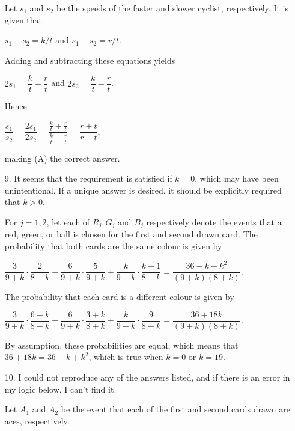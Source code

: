 \documentclass[11pt,fleqn,dvipsnames,usenames]{article}
\begin{document}
\begin{enumerate}
Let $s_{1}$ and $s_{2}$ be the speeds of the faster and slower cyclist, respectively.  It is given that
\begin{center}
$s_{1} + s_{2} = k/t$ and $s_{1} - s_{2} = r/t$.
\end{center}
Adding and subtracting these equations yields
\begin{center}
$2s_{1} = \dfrac{k}{t} + \dfrac{r}{t}$ and $2s_{2} = \dfrac{k}{t} - \dfrac{r}{t}$.
\end{center}
Hence
\begin{center}
$\dfrac{s_{1}}{s_{2}} = \dfrac{2s_{1}}{2s_{2}} = \dfrac{\frac{k}{t} + \frac{r}{t}}{\frac{k}{t} - \frac{r}{t}} = \dfrac{r+t}{r-t}$,
\end{center}
making (A) the correct answer.

\item[9.] It seems that the requirement is satisfied if $k=0$, which may have been unintentional.  If a unique answer is desired, it should be explicitly required that $k>0$.

For $j=1,2$, let each of $R_{j}, G_{j}$ and $B_{j}$ respectively denote the events that a red, green, or ball is chosen for the first and second drawn card.  The probability that both cards are the same colour is given by
\begin{center}
$\dfrac{3}{9+k}\cdot\dfrac{2}{8 + k} + \dfrac{6}{9+k}\cdot\dfrac{5}{9+k} + \dfrac{k}{9+k}\cdot\dfrac{k-1}{8+k} = \dfrac{36 - k + k^2}{(9+k)(8+k)}$.
\end{center}
%
The probability that each card is a different colour is given by
\begin{center}
$\dfrac{3}{9+k}\cdot \dfrac{6+k}{8+k} + \dfrac{6}{9+k}\cdot \dfrac{3+k}{8+k} + \dfrac{k}{9+k}\cdot \dfrac{9}{8+k} = \dfrac{36 + 18k}{(9+k)(8+k)}$.
\end{center}
By assumption, these probabilities are equal, which means that $36 + 18k = 36 - k + k^2$, which is true when $k = 0$ or $k=19$.

\item[10.] \note I could not reproduce any of the answers listed, and if there is an error in my logic below, I can't find it.

Let $A_{1}$ and $A_{2}$ be the event that each of the first and second cards drawn are aces, respectively.


\end{enumerate}
\end{document}

